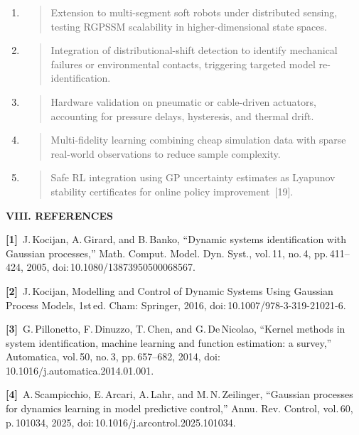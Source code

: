 \documentclass[letterpaper, 10pt, journal, twoside]{IEEEtran}
\begin{document}
\begin{enumerate}
\def\labelenumi{\arabic{enumi}.}
\item
  \begin{quote}
  Extension to multi-segment soft robots under distributed sensing,
  testing RGPSSM scalability in higher-dimensional state spaces.
  \end{quote}
\item
  \begin{quote}
  Integration of distributional-shift detection to identify mechanical
  failures or environmental contacts, triggering targeted model
  re-identification.
  \end{quote}
\item
  \begin{quote}
  Hardware validation on pneumatic or cable-driven actuators, accounting
  for pressure delays, hysteresis, and thermal drift.
  \end{quote}
\item
  \begin{quote}
  Multi-fidelity learning combining cheap simulation data with sparse
  real-world observations to reduce sample complexity.
  \end{quote}
\item
  \begin{quote}
  Safe RL integration using GP uncertainty estimates as Lyapunov
  stability certificates for online policy improvement~{[}19{]}.
  \end{quote}
\end{enumerate}

\textbf{VIII. REFERENCES}

\textbf{{[}1{]} }J.\,Kocijan, A.\,Girard, and B.\,Banko, ``Dynamic
systems identification with Gaussian processes,'' Math. Comput. Model.
Dyn. Syst., vol.\,11, no.\,4, pp.\,411--424, 2005,
doi:\,10.1080/13873950500068567.

\textbf{{[}2{]} }J.\,Kocijan, Modelling and Control of Dynamic Systems
Using Gaussian Process Models, 1st\,ed. Cham: Springer, 2016,
doi:\,10.1007/978-3-319-21021-6.

\textbf{{[}3{]} }G.\,Pillonetto, F.\,Dinuzzo, T.\,Chen, and
G.\,De\,Nicolao, ``Kernel methods in system identification, machine
learning and function estimation: a survey,'' Automatica, vol.\,50,
no.\,3, pp.\,657--682, 2014, doi:\,10.1016/j.automatica.2014.01.001.

\textbf{{[}4{]} }A.\,Scampicchio, E.\,Arcari, A.\,Lahr, and
M.\,N.\,Zeilinger, ``Gaussian processes for dynamics learning in model
predictive control,'' Annu. Rev. Control, vol.\,60, p.\,101034, 2025,
doi:\,10.1016/j.arcontrol.2025.101034.
\end{document}
